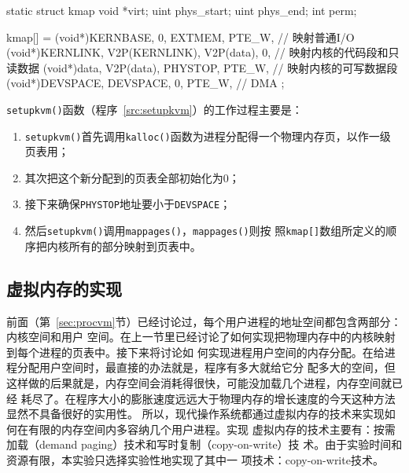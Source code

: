 \documentclass{swfcthesismscctex}
\begin{document}
\begin{listing}%
  \begin{codeblock}
\begin{ccode}
static struct kmap {
  void *virt;
  uint phys_start;
  uint phys_end;
  int perm;
}

kmap[] = {
  {(void*)KERNBASE, 0, EXTMEM, PTE_W}, // 映射普通I/O
  {(void*)KERNLINK, V2P(KERNLINK), V2P(data), 0}, // 映射内核的代码段和只读数据
  {(void*)data, V2P(data), PHYSTOP, PTE_W}, // 映射内核的可写数据段
  {(void*)DEVSPACE, DEVSPACE, 0, PTE_W}, // DMA
};
\end{ccode}
  \end{codeblock}
  \label{src:kmap}
\end{listing}

\texttt{setupkvm()}函数（程序~\ref{src:setupkvm}）的工作过程主要是：
\begin{enumerate}
\item \texttt{setupkvm()}首先调用\texttt{kalloc()}函数为进程分配得一个物理内存页，以作一级
  页表用；
\item 其次把这个新分配到的页表全部初始化为0；
\item 接下来确保\texttt{PHYSTOP}地址要小于\texttt{DEVSPACE}；
\item 然后\texttt{setupkvm()}调用\texttt{mappages()}，\texttt{mappages()}则按
  照\texttt{kmap[]}数组所定义的顺序把内核所有的部分映射到页表中。
\end{enumerate}

\subsection{虚拟内存的实现}

前面（第~\ref{sec:procvm}节）已经讨论过，每个用户进程的地址空间都包含两部分：内核空间和用户
空间。在上一节里已经讨论了如何实现把物理内存中的内核映射到每个进程的页表中。接下来将讨论如
何实现进程用户空间的内存分配。在给进程分配用户空间时，最直接的办法就是，程序有多大就给它分
配多大的空间，但这样做的后果就是，内存空间会消耗得很快，可能没加载几个进程，内存空间就已经
耗尽了。在程序大小的膨胀速度远远大于物理内存的增长速度的今天这种方法显然不具备很好的实用性。
所以，现代操作系统都通过虚拟内存的技术来实现如何在有限的内存空间内多容纳几个用户进程。实现
虚拟内存的技术主要有：按需加载（demand paging）技术和写时复制（copy-on-write）技
术\cite{silberschatz11essentials}。由于实验时间和资源有限，本实验只选择实验性地实现了其中一
项技术：copy-on-write技术。
\end{document}
